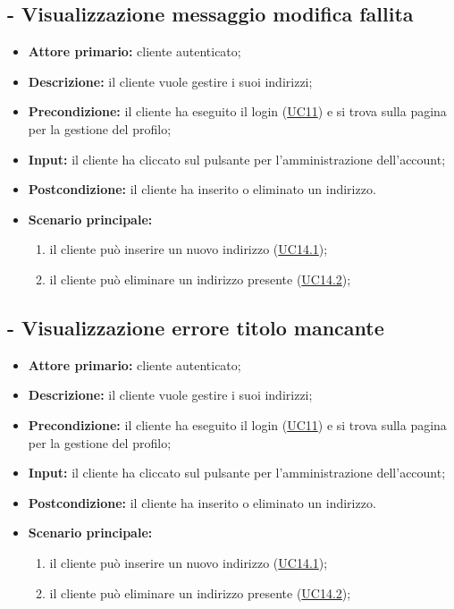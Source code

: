 \stepUserCase
\subsection{ - Visualizzazione messaggio modifica fallita}
\begin{itemize}
    \item \textbf{Attore primario:} cliente autenticato;
    \item \textbf{Descrizione:} il cliente vuole gestire i suoi indirizzi;
    \item \textbf{Precondizione:} il cliente ha eseguito il login (\hyperref[UC11]{UC11}) e si trova sulla pagina per la gestione del profilo;
    \item \textbf{Input:} il cliente ha cliccato sul pulsante per l'amministrazione dell'account;
    \item \textbf{Postcondizione:} il cliente ha inserito o eliminato un indirizzo.
    \item \textbf{Scenario principale:}
          \begin{enumerate}
              \item il cliente può inserire un nuovo indirizzo (\hyperref[UC14.1]{UC14.1});
              \item il cliente può eliminare un indirizzo presente (\hyperref[UC14.2]{UC14.2});
          \end{enumerate}
\end{itemize}

\stepUserCase
\subsection{ - Visualizzazione errore titolo mancante}
\begin{itemize}
    \item \textbf{Attore primario:} cliente autenticato;
    \item \textbf{Descrizione:} il cliente vuole gestire i suoi indirizzi;
    \item \textbf{Precondizione:} il cliente ha eseguito il login (\hyperref[UC11]{UC11}) e si trova sulla pagina per la gestione del profilo;
    \item \textbf{Input:} il cliente ha cliccato sul pulsante per l'amministrazione dell'account;
    \item \textbf{Postcondizione:} il cliente ha inserito o eliminato un indirizzo.
    \item \textbf{Scenario principale:}
          \begin{enumerate}
              \item il cliente può inserire un nuovo indirizzo (\hyperref[UC14.1]{UC14.1});
              \item il cliente può eliminare un indirizzo presente (\hyperref[UC14.2]{UC14.2});
          \end{enumerate}
\end{itemize}

